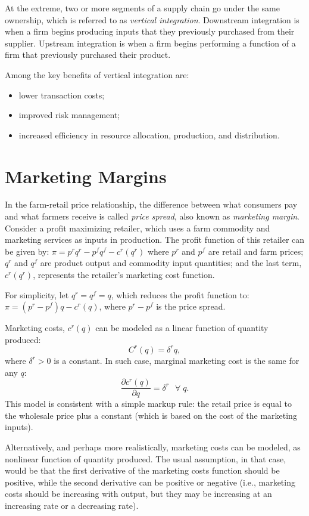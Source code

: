 \documentclass[
]{book}
\providecommand{\tightlist}{%
  \setlength{\itemsep}{0pt}\setlength{\parskip}{0pt}}
\begin{document}
At the extreme, two or more segments of a supply chain go under the same ownership, which is referred to as \emph{vertical integration}. Downstream integration is when a firm begins producing inputs that they previously purchased from their supplier. Upstream integration is when a firm begins performing a function of a firm that previously purchased their product.

Among the key benefits of vertical integration are:

\begin{itemize}
\tightlist
\item
  lower transaction costs;
\item
  improved risk management;
\item
  increased efficiency in resource allocation, production, and distribution.
\end{itemize}

\hypertarget{marketing-margins}{%
\section{Marketing Margins}\label{marketing-margins}}

In the farm-retail price relationship, the difference between what consumers pay and what farmers receive is called \emph{price spread}, also known as \emph{marketing margin}. Consider a profit maximizing retailer, which uses a farm commodity and marketing services as inputs in production. The profit function of this retailer can be given by: \(\pi = p^r q^r - p^f q^f - c^r(q^r)\) where \(p^r\) and \(p^f\) are retail and farm prices; \(q^r\) and \(q^f\) are product output and commodity input quantities; and the last term, \(c^r(q^r)\), represents the retailer's marketing cost function.

For simplicity, let \(q^r=q^f=q\), which reduces the profit function to: \(\pi = (p^r - p^f) q - c^r(q)\), where \(p^r - p^f\) is the price spread.

Marketing costs, \(c^r(q)\) can be modeled as a linear function of quantity produced: \[C^r(q) = \delta^r q,\] where \(\delta^r > 0\) is a constant. In such case, marginal marketing cost is the same for any \(q\): \[\frac{\partial c^r(q)}{\partial q} = \delta^r\;~~\forall\;q.\] This model is consistent with a simple markup rule: the retail price is equal to the wholesale price plus a constant (which is based on the cost of the marketing inputs).

Alternatively, and perhaps more realistically, marketing costs can be modeled, as nonlinear function of quantity produced. The usual assumption, in that case, would be that the first derivative of the marketing costs function should be positive, while the second derivative can be positive or negative (i.e., marketing costs should be increasing with output, but they may be increasing at an increasing rate or a decreasing rate).
\end{document}
